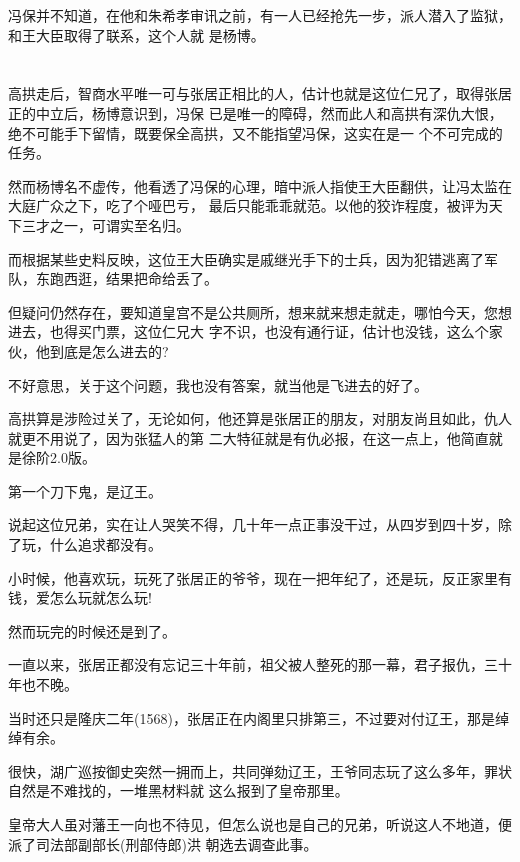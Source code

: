 \documentclass[11pt,a4paper,onecolumn]{article}
\begin{document}
冯保并不知道，在他和朱希孝审讯之前，有一人已经抢先一步，派人潜入了监狱，和王大臣取得了联系，这个人就
是杨博。

\section[\thesection]{}

高拱走后，智商水平唯一可与张居正相比的人，估计也就是这位仁兄了，取得张居正的中立后，杨博意识到，冯保
已是唯一的障碍，然而此人和高拱有深仇大恨，绝不可能手下留情，既要保全高拱，又不能指望冯保，这实在是一
个不可完成的任务。

然而杨博名不虚传，他看透了冯保的心理，暗中派人指使王大臣翻供，让冯太监在大庭广众之下，吃了个哑巴亏，
最后只能乖乖就范。以他的狡诈程度，被评为天下三才之一，可谓实至名归。

而根据某些史料反映，这位王大臣确实是戚继光手下的士兵，因为犯错逃离了军队，东跑西逛，结果把命给丢了。

但疑问仍然存在，要知道皇宫不是公共厕所，想来就来想走就走，哪怕今天，您想进去，也得买门票，这位仁兄大
字不识，也没有通行证，估计也没钱，这么个家伙，他到底是怎么进去的?

不好意思，关于这个问题，我也没有答案，就当他是飞进去的好了。

高拱算是涉险过关了，无论如何，他还算是张居正的朋友，对朋友尚且如此，仇人就更不用说了，因为张猛人的第
二大特征就是有仇必报，在这一点上，他简直就是徐阶2.0版。

第一个刀下鬼，是辽王。

说起这位兄弟，实在让人哭笑不得，几十年一点正事没干过，从四岁到四十岁，除了玩，什么追求都没有。

小时候，他喜欢玩，玩死了张居正的爷爷，现在一把年纪了，还是玩，反正家里有钱，爱怎么玩就怎么玩!

然而玩完的时候还是到了。

一直以来，张居正都没有忘记三十年前，祖父被人整死的那一幕，君子报仇，三十年也不晚。

当时还只是隆庆二年(1568)，张居正在内阁里只排第三，不过要对付辽王，那是绰绰有余。

很快，湖广巡按御史突然一拥而上，共同弹劾辽王，王爷同志玩了这么多年，罪状自然是不难找的，一堆黑材料就
这么报到了皇帝那里。

皇帝大人虽对藩王一向也不待见，但怎么说也是自己的兄弟，听说这人不地道，便派了司法部副部长(刑部侍郎)洪
朝选去调查此事。

\section[\thesection]{}
\end{document}
